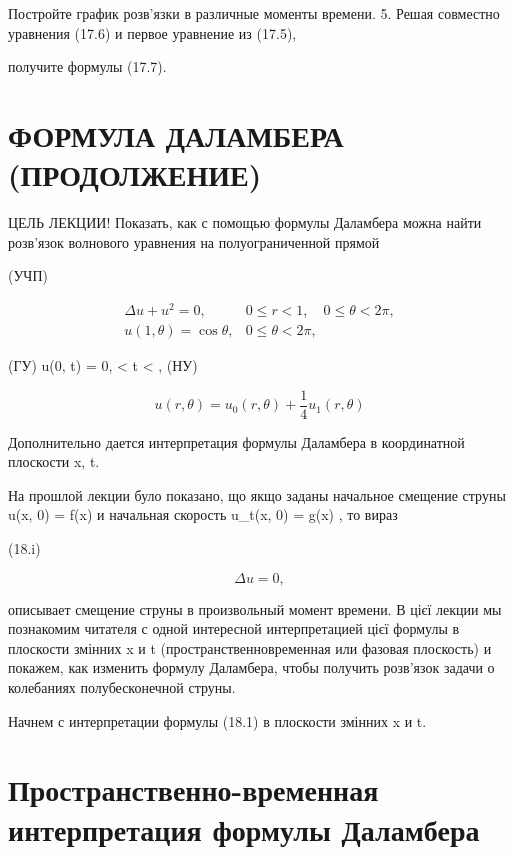 \documentclass[
  ukrainian,
]{article}
\begin{document}
Постройте график розв'язки в различные моменты времени. 5. Решая
совместно уравнения (17.6) и первое уравнение из (17.5),

получите формулы (17.7).

\section{ФОРМУЛА ДАЛАМБЕРА
(ПРОДОЛЖЕНИЕ)}\label{ux444ux43eux440ux43cux443ux43bux430-ux434ux430ux43bux430ux43cux431ux435ux440ux430-ux43fux440ux43eux434ux43eux43bux436ux435ux43dux438ux435}

ЦЕЛЬ ЛЕКЦИИ! Показать, как с помощью формулы Даламбера можна найти
розв'язок волнового уравнения на полуограниченной прямой

(УЧП)

\[
\begin{aligned} \Delta u + u^2 = 0, & 0 \leqslant r < 1, \quad 0 \leqslant \theta < 2\pi, \\ u(1, \theta) = \cos \theta, & 0 \leqslant \theta < 2\pi, \end{aligned}
\]

(ГУ) u(0, t) = 0,  \textless{} t \textless{} \infty, (НУ)

\[
u(r, \theta) = u_0(r, \theta) + \frac{1}{4}u_1(r, \theta)
\]

Дополнительно дается интерпретация формулы Даламбера в координатной
плоскости x, t.

На прошлой лекции було показано, що якщо заданы начальное смещение
струны u(x, 0) = f(x) и начальная скорость u\_t(x, 0) = g(x) , то вираз

(18.i)

\[
\Delta u = 0,
\]

описывает смещение струны в произвольный момент времени. В цієї лекции
мы познакомим читателя с одной интересной интерпретацией цієї формулы в
плоскости змінних x и t (пространственновременная или фазовая плоскость)
и покажем, как изменить формулу Даламбера, чтобы получить розв'язок
задачи о колебаниях полубесконечной струны.

Начнем с интерпретации формулы (18.1) в плоскости змінних x и t.

\section{Пространственно-временная интерпретация формулы
Даламбера}\label{ux43fux440ux43eux441ux442ux440ux430ux43dux441ux442ux432ux435ux43dux43dux43e-ux432ux440ux435ux43cux435ux43dux43dux430ux44f-ux438ux43dux442ux435ux440ux43fux440ux435ux442ux430ux446ux438ux44f-ux444ux43eux440ux43cux443ux43bux44b-ux434ux430ux43bux430ux43cux431ux435ux440ux430}
\end{document}
